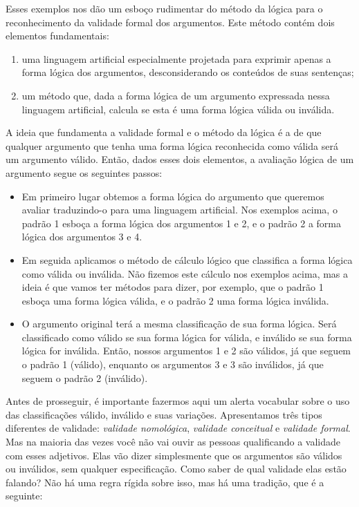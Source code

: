 Esses exemplos nos dão um esboço rudimentar do método da lógica para o reconhecimento da validade formal dos argumentos.
Este método contém dois elementos fundamentais:
\begin{enumerate}
	\item  uma linguagem artificial especialmente projetada para exprimir apenas a forma lógica dos argumentos, desconsiderando os conteúdos de suas sentenças;
	\item um método que, dada a forma lógica de um argumento expressada nessa linguagem artificial, calcula se esta é uma forma lógica válida ou inválida.
\end{enumerate}
A ideia que fundamenta a validade formal e o método da lógica é a de que qualquer argumento que tenha uma forma lógica reconhecida como válida será um argumento válido.
Então, dados esses dois elementos, a avaliação lógica de um argumento segue os seguintes passos:
\begin{itemize}
	\item Em primeiro lugar obtemos a forma lógica do argumento que queremos avaliar traduzindo-o para uma linguagem artificial. Nos exemplos acima, o padrão 1 esboça a forma lógica dos argumentos 1 e 2, e o padrão 2 a forma lógica dos argumentos 3 e 4.
	\item Em seguida aplicamos o método de cálculo lógico que classifica a forma lógica como válida ou inválida. Não fizemos este cálculo nos exemplos acima, mas a ideia é que vamos ter métodos para dizer, por exemplo, que o padrão 1 esboça uma forma lógica válida, e o padrão 2 uma forma lógica inválida.
	\item O argumento original terá a mesma classificação de sua forma lógica. Será classificado como válido se sua forma lógica for válida, e inválido se sua forma lógica for inválida. Então, nossos argumentos 1 e 2 são válidos, já que seguem o padrão 1 (válido), enquanto os argumentos 3 e 3 são inválidos, já que seguem o padrão 2 (inválido).
\end{itemize}
Antes de prosseguir, é importante fazermos aqui um alerta vocabular sobre o uso das classificações válido, inválido e suas variações.
Apresentamos três tipos diferentes de validade: \textit{validade nomológica}, \textit{validade conceitual} e \textit{validade formal}.
Mas na maioria das vezes você não vai ouvir as pessoas qualificando a validade com esses adjetivos.
Elas vão dizer simplesmente que os argumentos são válidos ou inválidos, sem qualquer especificação.
Como saber de qual validade elas estão falando?
Não há uma regra rígida sobre isso, mas há uma tradição, que é a seguinte:
